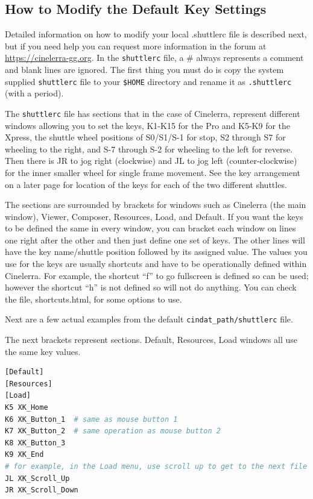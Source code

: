 \subsection{How to Modify the Default Key Settings}%
\label{sub:modify_default_key_settings}

Detailed information on how to modify your local .shuttlerc file is described next, but if you need help you can request more information in the forum at \url{https://cinelerra-gg.org}. In the \texttt{shuttlerc} file, a \# always represents a comment and blank lines are ignored.  The first thing you must do is copy the system supplied \texttt{shuttlerc} file to your \texttt{\$HOME} directory and rename it as \texttt{.shuttlerc} (with a period). 

The \texttt{shuttlerc} file has sections that in the case of Cinelerra, represent different windows allowing you to set the keys, K1-K15 for the Pro and K5-K9 for the Xpress, the shuttle wheel positions of S0/S1/S-1 for stop, S2 through S7 for wheeling to the right, and S-7 through S-2 for wheeling to the left for reverse.  Then there is JR to jog right (clockwise) and JL to jog left (counter-clockwise) for the inner smaller wheel for single frame movement.  See the key arrangement on a later page for location of the keys for each of the two different shuttles.

The sections are surrounded by brackets for windows such as Cinelerra (the main window), Viewer, Composer, Resources, Load, and Default.  If you want the keys to be defined the same in every window, you can bracket each window on lines one right after the other and then just define one set of keys.  The other lines will have the key name/shuttle position followed by its assigned value.  The values you use for the keys are usually shortcuts and have to be operationally defined within Cinelerra. For example, the shortcut “f” to go fullscreen is defined so can be used; however the shortcut “h” is not defined so will not do anything.  You can check the file, shortcuts.html, for some options to use.

Next are a few actual examples from the default \texttt{{cindat\_path}/shuttlerc} file.

\noindent The next brackets represent sections. Default, Resources, Load windows all use the same key values.

\begin{lstlisting}[language=Bash]
[Default] 
[Resources] 
[Load] 
K5 XK_Home 
K6 XK_Button_1	# same as mouse button 1 
K7 XK_Button_2	# same operation as mouse button 2
K8 XK_Button_3 
K9 XK_End 
# for example, in the Load menu, use scroll up to get to the next file name 
JL XK_Scroll_Up	
JR XK_Scroll_Down
\end{lstlisting}

